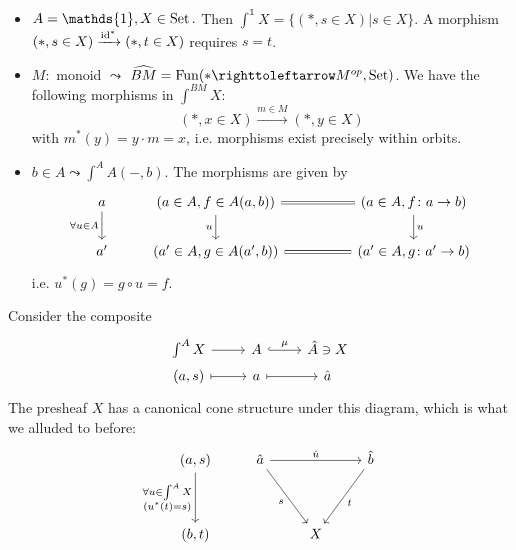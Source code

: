 \begin{exmp}
\begin{itemize}
    \item $A=\mathds{1}, X\in \Set.$ Then $\int^\mathds{1} X= \{(\ast,s\in X)\vert s\in X\}.$ A morphism $(\ast,s\in X)\xrightarrow{\operatorname{id}^*}(\ast,t\in X)$ requires $s=t$.
    
    \item $M\colon$ monoid $\leadsto$ $\widehat{BM}=\Fun(\ast\righttoleftarrow M^{op},\Set)$. We have the following morphisms in $\int^{BM} X:$ 
    \[(\ast,x\in X)\xrightarrow{m\in M}(\ast,y\in X)\] with $m^*(y)=y\cdot m = x$, i.e. morphisms exist precisely within orbits.
    \item $b\in A\leadsto \int^A A(-,b).$ The morphisms are given by
    \[
        \begin{tikzcd}
        a \arrow[d, "\forall u\in A"'] & {(a\in A, f\in A(a,b))} \arrow[d, "u"'] \arrow[rr, Rightarrow,no head] &  & {(a\in A, f\colon a\to b)} \arrow[d, "u"] \\
        a'                             & {(a'\in A, g\in A(a',b))} \arrow[rr, Rightarrow,no head]               &  & {(a'\in A, g\colon a'\to b)}             
        \end{tikzcd}
    \] i.e. $u^*(g)=g\circ u = f$.
    \end{itemize}
\end{exmp}

Consider the composite 
\[
    \begin{tikzcd}[row sep= 1pt]
    \int^A X \arrow[r]         & A \arrow[r, "\mu", hook] & \hat{A}\ni X \\
    {(a,s)} \arrow[r, maps to] & a \arrow[r, maps to]     & \hat{a}     
    \end{tikzcd}
\]
The presheaf $X$ has a canonical cone structure under this diagram, which is what we alluded to before: 
\[
    \begin{tikzcd}
    {(a,s)} \arrow[dd, "\substack{\forall u \in \int^AX\\(u^*(t)=s)}"'] & \hat{a} \arrow[rr, "\hat{u}"] \arrow[rdd, "s"'] &   & \hat{b} \arrow[ldd, "t"] \\
                                                                        &                                                 &   &                          \\
    {(b,t)}                                                             &                                                 & X &                         
    \end{tikzcd}
\]



